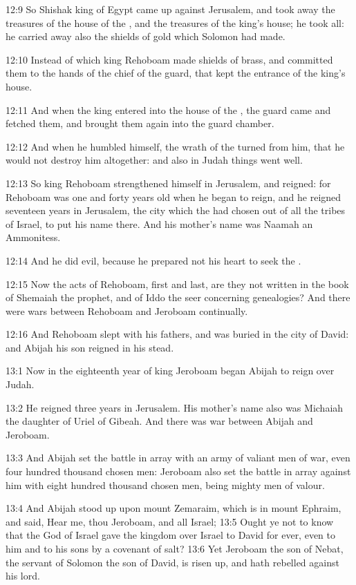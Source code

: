12:9 So Shishak king of Egypt came up against Jerusalem, and took away
the treasures of the house of the \LORD, and the treasures of the
king's house; he took all: he carried away also the shields of gold
which Solomon had made.

12:10 Instead of which king Rehoboam made shields of brass, and
committed them to the hands of the chief of the guard, that kept the
entrance of the king's house.

12:11 And when the king entered into the house of the \LORD, the guard
came and fetched them, and brought them again into the guard chamber.

12:12 And when he humbled himself, the wrath of the \LORD turned from
him, that he would not destroy him altogether: and also in Judah
things went well.

12:13 So king Rehoboam strengthened himself in Jerusalem, and reigned:
for Rehoboam was one and forty years old when he began to reign, and
he reigned seventeen years in Jerusalem, the city which the \LORD had
chosen out of all the tribes of Israel, to put his name there. And his
mother's name was Naamah an Ammonitess.

12:14 And he did evil, because he prepared not his heart to seek the
\LORD.

12:15 Now the acts of Rehoboam, first and last, are they not written
in the book of Shemaiah the prophet, and of Iddo the seer concerning
genealogies? And there were wars between Rehoboam and Jeroboam
continually.

12:16 And Rehoboam slept with his fathers, and was buried in the city
of David: and Abijah his son reigned in his stead.

13:1 Now in the eighteenth year of king Jeroboam began Abijah to reign
over Judah.

13:2 He reigned three years in Jerusalem. His mother's name also was
Michaiah the daughter of Uriel of Gibeah. And there was war between
Abijah and Jeroboam.

13:3 And Abijah set the battle in array with an army of valiant men of
war, even four hundred thousand chosen men: Jeroboam also set the
battle in array against him with eight hundred thousand chosen men,
being mighty men of valour.

13:4 And Abijah stood up upon mount Zemaraim, which is in mount
Ephraim, and said, Hear me, thou Jeroboam, and all Israel; 13:5 Ought
ye not to know that the \LORD God of Israel gave the kingdom over
Israel to David for ever, even to him and to his sons by a covenant of
salt?  13:6 Yet Jeroboam the son of Nebat, the servant of Solomon the
son of David, is risen up, and hath rebelled against his lord.

